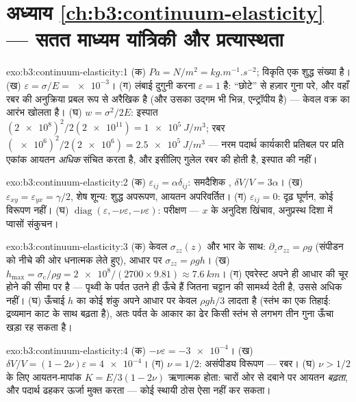 \section*{अध्याय \ref{ch:b3:continuum-elasticity} --- सतत माध्यम यांत्रिकी और प्रत्यास्थता}

\begin{solution}{exo:b3:continuum-elasticity:1}
(क) $\unit{Pa} = \unit{N/m^2} = \unit{kg.m^{-1}.s^{-2}}$; विकृति एक
शुद्ध संख्या है। (ख) $\varepsilon = \sigma/E = \num{e-3}$। (ग) लंबाई
दुगुनी करना $\varepsilon = 1$ है: ``छोटे'' से हज़ार गुना परे,
और वहाँ रबर की अनुक्रिया प्रबल रूप से अरैखिक है (और उसका उद्गम भी
भिन्न, एन्ट्रॉपीय है) ---  केवल वक्र का आरंभ खोलता है। (घ) $w =
\sigma^2/2E$: इस्पात $(\num{2e8})^2/2(\num{2e11}) =
\qty{1e5}{J/m^3}$; रबर $(\num{e6})^2/2(\num{2e6}) =
\qty{2.5e5}{J/m^3}$ --- नरम पदार्थ कार्यकारी प्रतिबल पर प्रति एकांक
आयतन \emph{अधिक} संचित करता है, और इसीलिए गुलेल रबर की होती है, इस्पात
की नहीं।
\end{solution}

\begin{solution}{exo:b3:continuum-elasticity:2}
(क) $\varepsilon_{ij} = \alpha\delta_{ij}$: समदैशिक ,
$\delta V/V = 3\alpha$। (ख) $\varepsilon_{xy} = \varepsilon_{yx} =
\gamma/2$, शेष शून्य: शुद्ध अपरूपण, आयतन अपरिवर्तित। (ग)
$\varepsilon_{ij} = 0$: दृढ़ घूर्णन, कोई विरूपण नहीं। (घ)
$\operatorname{diag}(\varepsilon, -\nu\varepsilon, -\nu\varepsilon)$:
 परीक्षण --- $x$ के अनुदिश खिंचाव, अनुप्रस्थ दिशा में प्वासों संकुचन।
\end{solution}

\begin{solution}{exo:b3:continuum-elasticity:3}
(क) केवल $\sigma_{zz}(z)$ और भार के साथ: $\partial_z\sigma_{zz} =
\rho g$ (संपीडन को नीचे की ओर धनात्मक लेते हुए), आधार पर $\sigma_{zz} = \rho
gh$। (ख) $h_{\max} = \sigma_{\text{c}}/\rho g =
\num{2e8}/(2700 \times 9.81) \approx \qty{7.6}{km}$। (ग) एवरेस्ट अपने ही
आधार की चूर होने की सीमा पर है --- पृथ्वी के पर्वत उतने ही ऊँचे हैं
जितना चट्टान की सामर्थ्य देती है, उससे अधिक नहीं। (घ) ऊँचाई $h$ का कोई
शंकु अपने आधार पर केवल $\rho gh/3$ लादता है (स्तंभ का एक तिहाई: द्रव्यमान
काट के साथ बढ़ता है), अतः पर्वत के आकार का ढेर किसी स्तंभ से लगभग तीन
गुना ऊँचा खड़ा रह सकता है।
\end{solution}

\begin{solution}{exo:b3:continuum-elasticity:4}
(क) $-\nu\varepsilon = \num{-3e-4}$। (ख) $\delta V/V = (1 -
2\nu)\varepsilon = \num{4e-4}$। (ग) $\nu = 1/2$: असंपीड्य
विरूपण --- रबर। (घ) $\nu > 1/2$ के लिए आयतन-मापांक $K =
E/3(1 - 2\nu)$ ऋणात्मक होता: चारों ओर से दबाने पर आयतन
\emph{बढ़ता}, और पदार्थ ढहकर ऊर्जा मुक्त करता --- कोई स्थायी ठोस ऐसा
नहीं कर सकता।
\end{solution}

